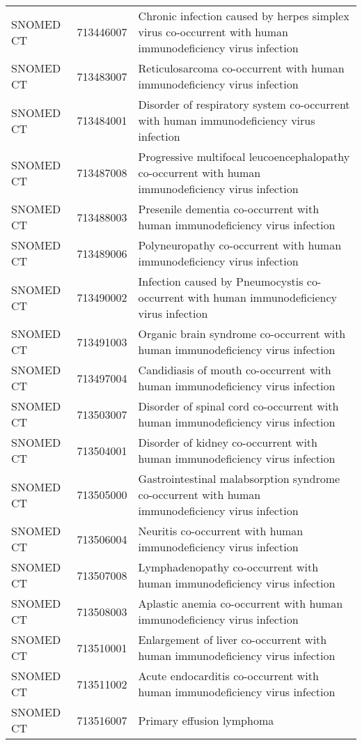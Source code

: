 \begin{table}[ht]
\begin{tabular}{lll}
  SNOMED CT & 713446007 & Chronic infection caused by herpes simplex virus co-occurrent with human immunodeficiency virus infection \\ 
  SNOMED CT & 713483007 & Reticulosarcoma co-occurrent with human immunodeficiency virus infection \\ 
  SNOMED CT & 713484001 & Disorder of respiratory system co-occurrent with human immunodeficiency virus infection \\ 
  SNOMED CT & 713487008 & Progressive multifocal leucoencephalopathy co-occurrent with human immunodeficiency virus infection \\ 
  SNOMED CT & 713488003 & Presenile dementia co-occurrent with human immunodeficiency virus infection \\ 
  SNOMED CT & 713489006 & Polyneuropathy co-occurrent with human immunodeficiency virus infection \\ 
  SNOMED CT & 713490002 & Infection caused by Pneumocystis co-occurrent with human immunodeficiency virus infection \\ 
  SNOMED CT & 713491003 & Organic brain syndrome co-occurrent with human immunodeficiency virus infection \\ 
  SNOMED CT & 713497004 & Candidiasis of mouth co-occurrent with human immunodeficiency virus infection \\ 
  SNOMED CT & 713503007 & Disorder of spinal cord co-occurrent with human immunodeficiency virus infection \\ 
  SNOMED CT & 713504001 & Disorder of kidney co-occurrent with human immunodeficiency virus infection \\ 
  SNOMED CT & 713505000 & Gastrointestinal malabsorption syndrome co-occurrent with human immunodeficiency virus infection \\ 
  SNOMED CT & 713506004 & Neuritis co-occurrent with human immunodeficiency virus infection \\ 
  SNOMED CT & 713507008 & Lymphadenopathy co-occurrent with human immunodeficiency virus infection \\ 
  SNOMED CT & 713508003 & Aplastic anemia co-occurrent with human immunodeficiency virus infection \\ 
  SNOMED CT & 713510001 & Enlargement of liver co-occurrent with human immunodeficiency virus infection \\ 
  SNOMED CT & 713511002 & Acute endocarditis co-occurrent with human immunodeficiency virus infection \\ 
  SNOMED CT & 713516007 & Primary effusion lymphoma \\ 

\end{tabular}
\end{table}
